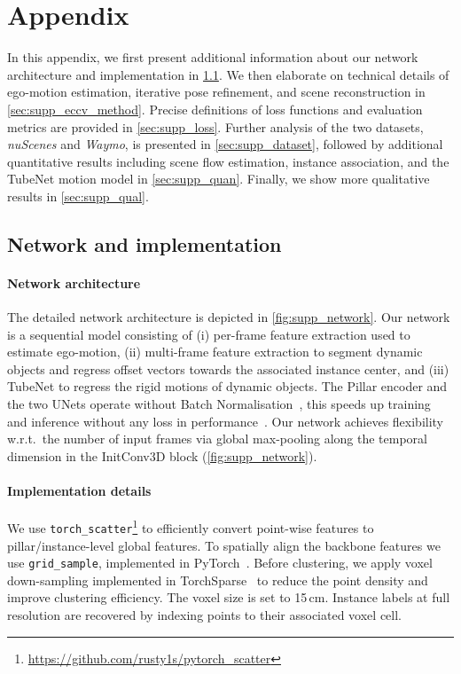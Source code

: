 \section{Appendix}
In this appendix, we first present additional information about our network architecture and implementation in \cref{sec:supp_network}. We then elaborate on technical details of ego-motion estimation, iterative pose refinement, and scene reconstruction in \cref{sec:supp_eccv_method}. Precise definitions of loss functions and evaluation metrics are provided in \cref{sec:supp_loss}. Further analysis of the two datasets, \emph{nuScenes} and \emph{Waymo}, is presented in \cref{sec:supp_dataset}, followed by additional quantitative results including scene flow estimation, instance association, and the TubeNet motion model in \cref{sec:supp_quan}. Finally, we show more qualitative results in \cref{sec:supp_qual}. 

\subsection{Network and implementation}
\label{sec:supp_network}

\paragraph{Network architecture}
The detailed network architecture is depicted in \cref{fig:supp_network}. Our network is a sequential model consisting of (i) per-frame feature extraction used to estimate ego-motion, (ii) multi-frame feature extraction to segment dynamic objects and regress offset vectors towards the associated instance center, and (iii) TubeNet to regress the rigid motions of dynamic objects. The Pillar encoder and the two UNets operate without Batch Normalisation~\cite{ioffe2015batch}, this speeds up training and inference without any loss in performance~\cite{peng2020convolutional}. Our network achieves flexibility w.r.t.\ the number of input frames via global max-pooling along the temporal dimension in the InitConv3D block (\cref{fig:supp_network}).

\paragraph{Implementation details}
We use \texttt{torch\_scatter}\footnote{\url{https://github.com/rusty1s/pytorch_scatter}} to efficiently convert point-wise features to pillar/instance-level global features. To spatially align the backbone features we use \texttt{grid\_sample}, implemented in PyTorch~\cite{NEURIPS2019_9015}. Before clustering, we apply voxel down-sampling implemented in TorchSparse~\cite{tang2022torchsparse} to reduce the point density and improve clustering efficiency. The voxel size is set to 15$\,$cm. Instance labels at full resolution are recovered by indexing points to their associated voxel cell. 

